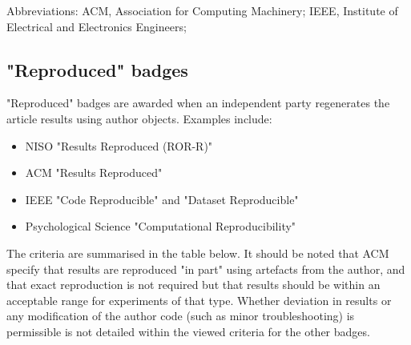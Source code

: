 \vspace*{-1.5\baselineskip}
\footnotesize
Abbreviations: ACM, Association for Computing Machinery; IEEE, Institute of Electrical and Electronics Engineers;
\normalsize 
\\

\newpage
\subsection{"Reproduced" badges}

"Reproduced" badges are awarded when an independent party regenerates the article results using author objects.\autocite{niso_reproducibility_badging_and_definitions_working_group_reproducibility_2021} Examples include:
\begin{itemize}
    \item NISO "Results Reproduced (ROR-R)"\autocite{niso_reproducibility_badging_and_definitions_working_group_reproducibility_2021}
    \item ACM "Results Reproduced"\autocite{association_for_computing_machinery_acm_artifact_2020}
    \item IEEE "Code Reproducible" and "Dataset Reproducible"\autocite{institute_of_electrical_and_electronics_engineers_ieee_about_nodate}
    \item Psychological Science "Computational Reproducibility"\autocite{hardwicke_transparency_2023,association_for_psychological_science_aps_psychological_2023}
\end{itemize}

The criteria are summarised in the table below. It should be noted that ACM specify that results are reproduced "in part" using artefacts from the author, and that exact reproduction is not required but that results should be within an acceptable range for experiments of that type.\autocite{association_for_computing_machinery_acm_artifact_2020} Whether deviation in results or any modification of the author code (such as minor troubleshooting) is permissible is not detailed within the viewed criteria for the other badges.

